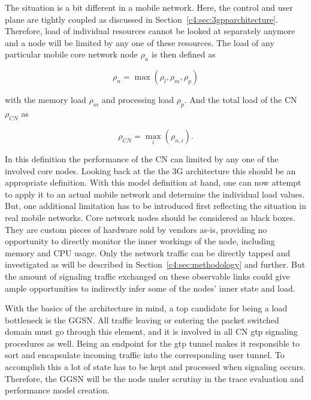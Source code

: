 The situation is a bit different in a mobile network. Here, the control and user plane are tightly coupled as discussed in Section~\ref{c4:sec:3gpparchitecture}.  Therefore, load of individual resources cannot be looked at separately anymore and a node will be limited by any one of these resources. The load of any particular mobile core network node $\rho_{n}$ is then defined as

\begin{equation}
\rho_{n} = \max(\rho_{l}, \rho_{m}, \rho_{p})
\end{equation}

with the memory load $\rho_{m}$ and processing load $\rho_{p}$. And the total load of the \gls{CN} $\rho_{CN}$ as

\begin{equation}
\rho_{CN} = \max_{i}(\rho_{n,i})\text{.}
\end{equation}

In this definition the performance of the \gls{CN} can limited by any one of the involved core nodes. Looking back at the the \gls{3G} architecture this should be an appropriate definition. With this model definition at hand, one can now attempt to apply it to an actual mobile network and determine the individual load values. But, one additional limitation has to be introduced first reflecting the situation in real mobile networks. Core network nodes should be considered as black boxes. They are custom pieces of hardware sold by vendors as-is, providing no opportunity to directly monitor the inner workings of the node, including memory and CPU usage. Only the network traffic can be directly tapped and investigated as will be described in Section~\ref{c4:sec:methodology} and further. But the amount of signaling traffic exchanged on these observable links could give ample opportunities to indirectly infer some of the nodes' inner state and load.

With the basics of the architecture in mind, a top candidate for being a load bottleneck is the \gls{GGSN}. All traffic leaving or entering the packet switched domain must go through this element, and it is involved in all \gls{CN} \gls{gtp} signaling procedures as well. Being an endpoint for the \gls{gtp} tunnel makes it responsible to sort and encapsulate incoming traffic into the corresponding user tunnel. To accomplish this a lot of state has to be kept and processed when signaling occurs. Therefore, the \gls{GGSN} will be the node under scrutiny in the trace evaluation and performance model creation.

